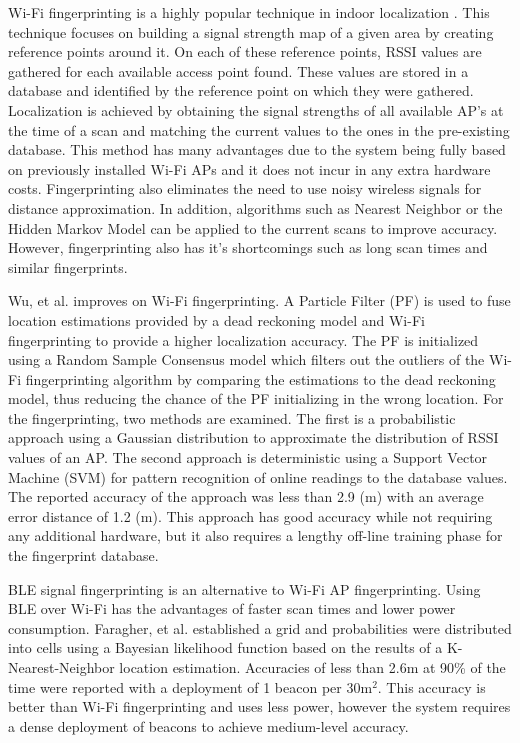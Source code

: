 \documentclass[conference]{IEEEtran}
\begin{document}
Wi-Fi fingerprinting is a highly popular technique in indoor localization \cite{chan2012indoor,navarro2010wi}. This technique focuses on  building a signal strength map of a given area by creating reference points around it. On each of these reference points, RSSI values are gathered for each available access point found. These values are stored in a database and identified by the reference point on which they were gathered. Localization is achieved by obtaining the signal strengths of all available AP’s at the time of a scan and matching the current values to the ones in the pre-existing database. This method has many advantages due to the system being fully based on previously installed Wi-Fi APs and it does not incur in any extra hardware costs. Fingerprinting also eliminates the need to use noisy wireless signals for distance approximation. In addition, algorithms such as Nearest Neighbor or the Hidden Markov Model can be applied to the current scans to improve accuracy. However, fingerprinting also has it’s shortcomings such as long scan times and similar fingerprints.

Wu, et al. \cite{wu2016improved} improves on  Wi-Fi fingerprinting. A Particle Filter (PF) is used to fuse location estimations provided by a dead reckoning model and Wi-Fi fingerprinting to provide a higher localization accuracy. The PF is initialized using a Random Sample Consensus model which filters out the outliers of the Wi-Fi fingerprinting algorithm by comparing the estimations to the dead reckoning model, thus reducing the chance of the PF initializing in the wrong location. For the fingerprinting, two methods are examined. The first is a probabilistic approach using a Gaussian distribution to approximate the distribution of RSSI values of an AP. The second approach is deterministic using a Support Vector Machine (SVM) for pattern recognition of online readings to the database values.  The reported accuracy of the approach was less than 2.9 (m) with an average error distance of 1.2 (m). This approach has good accuracy while not requiring any additional hardware, but it also requires a lengthy off-line training phase for the fingerprint database.

BLE signal fingerprinting is an alternative to Wi-Fi AP fingerprinting. Using BLE over Wi-Fi has the advantages of faster scan times and lower power consumption. Faragher, et al. \cite{faragher2015location} established a grid and probabilities were distributed into cells using a Bayesian likelihood function based on the results of a K-Nearest-Neighbor location estimation. Accuracies of less than 2.6m at 90\% of the time were reported with a deployment of 1 beacon per 30m$^2$. This accuracy is better than Wi-Fi fingerprinting and uses less power, however the  system  requires a dense deployment of beacons to achieve medium-level accuracy.
\end{document}
